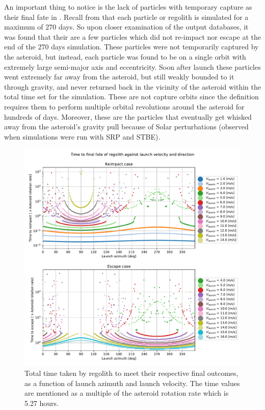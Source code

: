An important thing to notice is the lack of particles with temporary capture as their final fate in . Recall from  that each particle or regolith is simulated for a maximum of 270 days. So upon closer examination of the output databases, it was found that their are a few particles which did not re-impact nor escape at the end of the 270 days simulation. These particles were not temporarily captured by the asteroid, but instead, each particle was found to be on a single orbit with extremely large semi-major axis and eccentricity. Soon after launch these particles went extremely far away from the asteroid, but still weakly bounded to it through gravity, and never returned back in the vicinity of the asteroid within the total time set for the simulation. These are not capture orbits since the definition requires them to perform multiple orbital revolutions around the asteroid for hundreds of days. Moreover, these are the particles that eventually get whisked away from the asteroid's gravity pull because of Solar perturbations (observed when simulations were run with \gls{SRP} and \gls{STBE}).
\begin{figure}[htb]
\centering
\captionsetup{justification=centering}
\includegraphics[width=\textwidth, height=\textheight, keepaspectratio=true]{Images/longest_edge_no_perturbations/time_to_final_fate_all_velocities_newLegend.pdf}
\caption{Total time taken by regolith to meet their respective final outcomes, as a function of launch azimuth and launch velocity. The time values are mentioned as a multiple of the asteroid rotation rate which is 5.27 hours.}
\label{fig:final_fate_time_noSP}
\end{figure}
